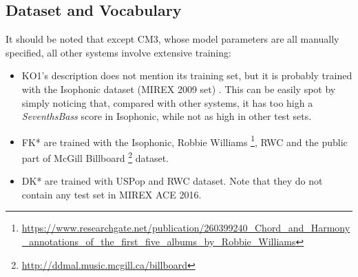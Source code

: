 \subsection{Dataset and Vocabulary}
It should be noted that except CM3, whose model parameters are all manually specified, all other systems involve extensive training:
\begin{itemize}
\item KO1's description does not mention its training set, but it is probably trained with the Isophonic dataset (MIREX 2009 set) \cite{burgoyne2014comparative}. This can be easily spot by simply noticing that, compared with other systems, it has too high a \textit{SeventhsBass} score in Isophonic, while not as high in other test sets.

\item FK* are trained with the Isophonic, Robbie Williams \footnote{\url{https://www.researchgate.net/publication/260399240\_Chord\_and\_Harmony\_annotations\_of\_the\_first\_five\_albums\_by\_Robbie\_Williams}}, RWC and the public part of McGill Billboard \footnote{\url{http://ddmal.music.mcgill.ca/billboard}} dataset.

\item DK* are trained with USPop and RWC dataset. Note that they do not contain any test set in MIREX ACE 2016.
\end{itemize}


